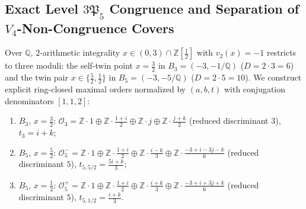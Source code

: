 \documentclass[11pt]{amsart}
\numberwithin{equation}{section}
\theoremstyle{plain}
\theoremstyle{definition}\newtheorem{definition}[theorem]{Definition}
\theoremstyle{remark}\newtheorem{remark}[theorem]{Remark}
\newcommand{\Q}{\mathbb{Q}}
\newcommand{\Z}{\mathbb{Z}}
\newcommand{\calO}{\mathcal{O}}
\newcommand{\frP}{\mathfrak{P}}
\begin{document}
\subsection{Exact Level \texorpdfstring{$3\frP_5$}{3P5} Congruence and Separation of \texorpdfstring{$V_4$}{V4}-Non-Congruence Covers}\label{sec:rational_nauru}
Over $\Q$, $2$-arithmetic integrality $x \in (0,3)\cap\Z[\frac{1}{2}]$ with $v_2(x)=-1$ restricts to three moduli: the self-twin point $x=\frac{3}{2}$ in $B_3 = (-3,-1/\Q)$ ($D = 2\cdot 3 = 6$) and the twin pair $x \in \{\frac{5}{2},\frac{1}{2}\}$ in $B_5 = (-3,-5/\Q)$ ($D = 2\cdot 5 = 10$). We construct explicit ring-closed maximal orders normalized by $(a,b,t)$ with conjugation denominators $[1,1,2]$:
\begin{enumerate}[label=(\roman*),nosep]
\item $B_3$, $x=\frac{3}{2}$: $\calO_3 = \Z\cdot 1 \oplus \Z\cdot \tfrac{1+i}{2} \oplus \Z\cdot j \oplus \Z\cdot \tfrac{j+k}{2}$ (reduced discriminant $3$), $t_3 = i + k$;
\item $B_5$, $x=\frac{5}{2}$: $\calO_5^- = \Z\cdot 1 \oplus \Z\cdot \tfrac{1+i}{2} \oplus \Z\cdot \tfrac{i-k}{3} \oplus \Z\cdot \tfrac{-3+i-3j-k}{6}$ (reduced discriminant $5$), $t_{5,5/2} = \tfrac{5i+k}{3}$;
\item $B_5$, $x=\frac{1}{2}$: $\calO_5^+ = \Z\cdot 1 \oplus \Z\cdot \tfrac{1+i}{2} \oplus \Z\cdot \tfrac{i+k}{3} \oplus \Z\cdot \tfrac{-3+i+3j+k}{6}$ (reduced discriminant $5$), $t_{5,1/2} = \tfrac{i+k}{3}$.
\end{enumerate}
\end{document}

